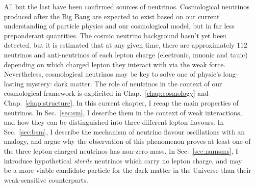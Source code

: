 \begin{intro}
All but the last have been confirmed sources of neutrinos. Cosmological neutrinos produced after the Big Bang are expected to exist based on our current understanding of particle physics and our cosmological model, but in far less preponderant quantities. The cosmic neutrino background hasn't yet been detected, but it is estimated that at any given time, there are approximately $112$ neutrinos and anti-neutrinos of each lepton charge (electronic, muonic and tauic) depending on which charged lepton they interact with via the weak force. Nevertheless, cosmological neutrinos may be key to solve one of physic's long-lasting mystery: dark matter. The role of neutrinos in the context of our cosmological framework is explicited in Chap.~\ref{chap:cosmology} and Chap.~\ref{chap:structure}. In this current chapter, I recap the main properties of neutrinos. In Sec.~\ref{sec:sm}, I describe them in the context of weak interactions, and how they can be distinguished into three different lepton flavours. In Sec.~\ref{sec:bsm}, I describe the mechanism of neutrino flavour oscillations with an analogy, and argue why the observation of this phenomenon proves at least one of the three lepton-charged neutrinos has non-zero mass. In Sec.~\ref{sec:numsms}, I introduce hypothetical \textit{sterile} neutrinos which carry no lepton charge, and may be a more viable candidate particle for the dark matter in the Universe than their weak-sensitive counterparts. 

\end{intro}

